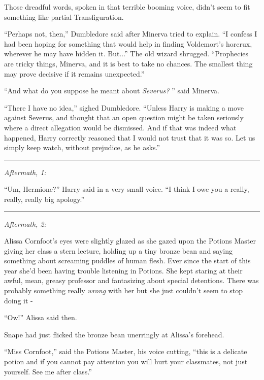Those dreadful words, spoken in that terrible booming voice, didn't seem
to fit something like partial Transfiguration.

``Perhaps not, then,'' Dumbledore said after Minerva tried to explain.
``I confess I had been hoping for something that would help in finding
Voldemort's horcrux, wherever he may have hidden it. But...'' The
old wizard shrugged. ``Prophecies are tricky things, Minerva, and it is
best to take no chances. The smallest thing may prove decisive if it
remains unexpected.''

``And what do you suppose he meant about \emph{Severus?} '' said Minerva.

``There I have no idea,'' sighed Dumbledore. ``Unless Harry is making a
move against Severus, and thought that an open question might be taken
seriously where a direct allegation would be dismissed. And if that was
indeed what happened, Harry correctly reasoned that I would not trust
that it was so. Let us simply keep watch, without prejudice, as he
asks.''

\begin{center}\rule{3in}{0.4pt}\end{center}

\emph{Aftermath, 1:}

``Um, Hermione?'' Harry said in a very small voice. ``I think I owe you
a really, really, really big apology.''

\begin{center}\rule{3in}{0.4pt}\end{center}

\emph{Aftermath, 2:}

Alissa Cornfoot's eyes were slightly glazed as she gazed upon the
Potions Master giving her class a stern lecture, holding up a tiny
bronze bean and saying something about screaming puddles of human flesh.
Ever since the start of this year she'd been having trouble listening in
Potions. She kept staring at their awful, mean, greasy professor and
fantasizing about special detentions. There was probably something
really \emph{wrong} with her but she just couldn't seem to stop doing it
-

``Ow!'' Alissa said then.

Snape had just flicked the bronze bean unerringly at Alissa's forehead.

``Miss Cornfoot,'' said the Potions Master, his voice cutting, ``this is
a delicate potion and if you cannot pay attention you will hurt your
classmates, not just yourself. See me after class.''

